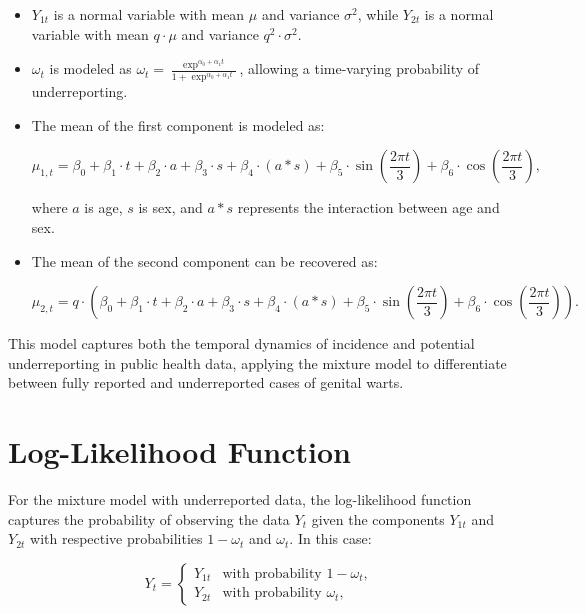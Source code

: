 \documentclass[acmsmall, nonacm]{acmart}
\begin{document}
\begin{itemize}
    \item \( Y_{1t} \) is a normal variable with mean \( \mu \) and variance \( \sigma^2 \), while \( Y_{2t} \) is a normal variable with mean \( q \cdot \mu \) and variance \( q^2 \cdot \sigma^2 \).
    \item \( \omega_t \) is modeled as \( \omega_t = \frac{\exp^{\alpha_0 + \alpha_1t}}{1+\exp^{\alpha_0 + \alpha_1t}} \), allowing a time-varying probability of underreporting.
    \item The mean of the first component is modeled as:

    \[
    \mu_{1,t} = \beta_0 + \beta_1 \cdot t + \beta_2 \cdot a + \beta_3 \cdot s + \beta_4 \cdot (a \ast s) + \beta_5 \cdot \sin\left(\frac{2 \pi t}{3}\right) + \beta_6 \cdot \cos\left(\frac{2 \pi t}{3}\right),
    \]

    where \( a \) is age, \( s \) is sex, and \( a \ast s \) represents the interaction between age and sex.

    \item The mean of the second component can be recovered as:

    \[
    \mu_{2,t} = q \cdot \left(\beta_0 + \beta_1 \cdot t + \beta_2 \cdot a + \beta_3 \cdot s + \beta_4 \cdot (a \ast s) + \beta_5 \cdot \sin\left(\frac{2 \pi t}{3}\right) + \beta_6 \cdot \cos\left(\frac{2 \pi t}{3}\right)\right).
    \]
\end{itemize}

This model captures both the temporal dynamics of incidence and potential underreporting in public health data, applying the mixture model to differentiate between fully reported and underreported cases of genital warts.

\section*{Log-Likelihood Function}

For the mixture model with underreported data, the log-likelihood function captures the probability of observing the data \( Y_t \) given the components \( Y_{1t} \) and \( Y_{2t} \) with respective probabilities \( 1 - \omega_t \) and \( \omega_t \). In this case:

\[
Y_t = 
\begin{cases} 
Y_{1t} & \text{with probability } 1 - \omega_t, \\ 
Y_{2t} & \text{with probability } \omega_t,
\end{cases}
\]
\end{document}

